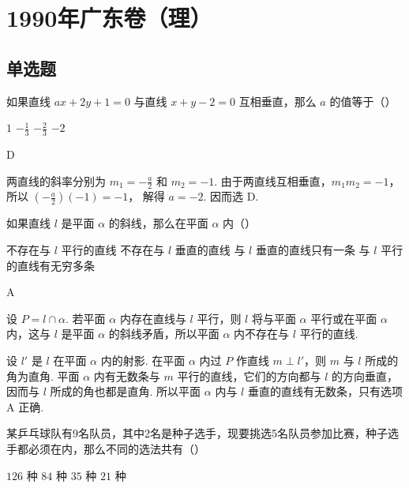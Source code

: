 \chapter{1990年广东卷（理）}
\section{单选题}

\begin{problem}
如果直线 \(ax+2y+1=0\) 与直线 \(x+y-2=0\) 互相垂直，那么 \(a\) 的值等于（\quad）

\choices
    {\(1\)}
    {\(-\frac{1}{3}\)}
    {\(-\frac{2}{3}\)}
    {\(-2\)}
\end{problem}

\begin{answer}
D
\end{answer}

\begin{solution}
两直线的斜率分别为 \(m_1=-\frac{a}{2}\) 和 \(m_2=-1\). 由于两直线互相垂直，\(m_1m_2=-1\)，所以
\(\left(-\frac{a}{2}\right)(-1)=-1\)，
解得 \(a=-2\). 因而选 D.
\end{solution}

\begin{problem}
如果直线 \(l\) 是平面 \(\alpha\) 的斜线，那么在平面 \(\alpha\) 内（\quad）

\choices
    {不存在与 \(l\) 平行的直线}
    {不存在与 \(l\) 垂直的直线}
    {与 \(l\) 垂直的直线只有一条}
    {与 \(l\) 平行的直线有无穷多条}
\end{problem}

\begin{answer}
A
\end{answer}

\begin{solution}
设 \(P=l\cap\alpha\). 若平面 \(\alpha\) 内存在直线与 \(l\) 平行，则 \(l\) 将与平面 \(\alpha\) 平行或在平面 \(\alpha\) 内，这与 \(l\) 是平面 \(\alpha\) 的斜线矛盾，所以平面 \(\alpha\) 内不存在与 \(l\) 平行的直线.

设 \(l'\) 是 \(l\) 在平面 \(\alpha\) 内的射影. 在平面 \(\alpha\) 内过 \(P\) 作直线 \(m\perp l'\)，则 \(m\) 与 \(l\) 所成的角为直角. 平面 \(\alpha\) 内有无数条与 \(m\) 平行的直线，它们的方向都与 \(l\) 的方向垂直，因而与 \(l\) 所成的角也都是直角. 所以平面 \(\alpha\) 内与 \(l\) 垂直的直线有无数条，只有选项 A 正确.
\end{solution}

\begin{problem}
某乒乓球队有9名队员，其中2名是种子选手，现要挑选5名队员参加比赛，种子选手都必须在内，那么不同的选法共有（\quad）

\choices
    {\(126\) 种}
    {\(84\) 种}
    {\(35\) 种}
    {\(21\) 种}
\end{problem}

